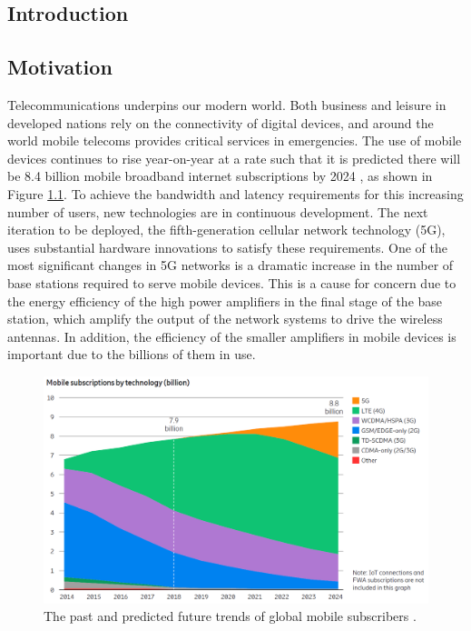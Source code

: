 \documentclass[../thesis/thesis.tex]{subfiles}
\begin{document}
\begin{refsection}
\chapter{Introduction}
\section{Motivation}

Telecommunications underpins our modern world. Both business and leisure in developed nations rely on the connectivity of digital devices, and around the world mobile telecoms provides critical services in emergencies. The use of mobile devices continues to rise year-on-year at a rate such that it is predicted there will be 8.4 billion mobile broadband internet subscriptions by 2024 \cite{Ericsson_2019}, as shown in Figure \ref{ch1_fig_ericsson}. To achieve the bandwidth and latency requirements for this increasing number of users, new technologies are in continuous development. The next iteration to be deployed, the fifth-generation cellular network technology (5G), uses substantial hardware innovations to satisfy these requirements. One of the most significant changes in 5G networks is a dramatic increase in the number of base stations required to serve mobile devices. This is a cause for concern due to the energy efficiency of the high power amplifiers in the final stage of the base station, which amplify the output of the network systems to drive the wireless antennas. In addition, the efficiency of the smaller amplifiers in mobile devices is important due to the billions of them in use.

\begin{figure}
	\centering
	\includegraphics[width=\textwidth]{ch1_ericsson}
	\caption{The past and predicted future trends of global mobile subscribers \cite{Ericsson_2019}.}
	\label{ch1_fig_ericsson}
\end{figure}


\end{refsection}
\end{document}

